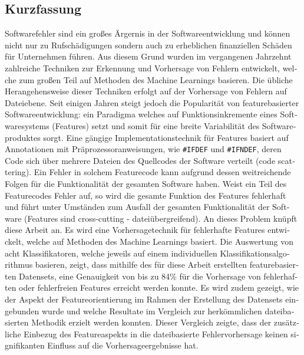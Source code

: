 
\begin{otherlanguage}{ngerman}
    \section*{Kurzfassung}

Softwarefehler sind ein großes Ärgernis in der Softwareentwicklung und können nicht nur zu Rufschädigungen sondern auch zu erheblichen finanziellen Schäden für Unternehmen führen. Aus diesem Grund wurden im vergangenen Jahrzehnt zahlreiche Techniken zur Erkennung und Vorhersage von Fehlern entwickelt, welche zum großen Teil auf Methoden des Machine Learnings basieren. Die übliche Herangehensweise dieser Techniken erfolgt auf der Vorhersage von Fehlern auf Dateiebene. Seit einigen Jahren steigt jedoch die Popularität von featurebasierter Softwareentwicklung: ein Paradigma welches auf Funktionsinkremente eines Softwaresystems (Features) setzt und somit für eine breite Variabilität des Softwareproduktes sorgt. Eine gängige Implementationstechnik für Features basiert auf Annotationen mit Präprozessoranweisungen, wie \texttt{\#IFDEF} und \texttt{\#IFNDEF}, deren Code sich über mehrere Dateien des Quellcodes der Software verteilt (\glqq code scattering\grqq). Ein Fehler in solchem Featurecode kann aufgrund dessen weitreichende Folgen für die Funktionalität der gesamten Software haben. Weist ein Teil des Featurecodes Fehler auf, so wird die gesamte Funktion des Features fehlerhaft und führt unter Umständen zum Ausfall der gesamten Funktionalität der Software (Features sind \glqq cross-cutting\grqq{} - dateiübergreifend). An dieses Problem knüpft diese Arbeit an. Es wird eine Vorhersagetechnik für fehlerhafte Features entwickelt, welche auf Methoden des Machine Learnings basiert. Die Auswertung von acht Klassifikatoren, welche jeweils auf einem individuellen Klassifikationsalgorithmus basieren, zeigt, dass mithilfe des für diese Arbeit erstellten featurebasierten Datensets, eine Genauigkeit von bis zu 84\% für die Vorhersage von fehlerhaften oder fehlerfreien Features erreicht werden konnte. Es wird zudem gezeigt, wie der Aspekt der Featureorientierung im Rahmen der Erstellung des Datensets eingebunden wurde und welche Resultate im Vergleich zur herkömmlichen dateibasierten Methodik erzielt werden konnten. Dieser Vergleich zeigte, dass der zusätzliche Einbezug des Featureaspekts in die dateibasierte Fehlervorhersage keinen signifikanten Einfluss auf die Vorhersageergebnisse hat.

\end{otherlanguage}

